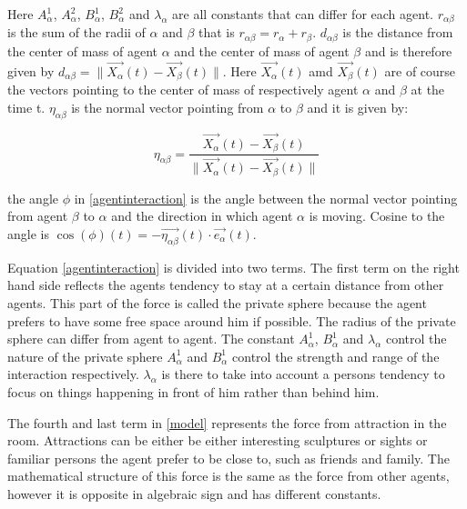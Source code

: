 Here $A_{\alpha}^{1}$, $A_{\alpha}^{2}$, $B_{\alpha}^{1}$, $B_{\alpha}^{2}$ 
and $\lambda_{\alpha}$ are all constants that can differ for each agent. 
$r_{\alpha \beta}$ is the sum of the radii of $\alpha$ and $\beta$ that is 
$r_{\alpha \beta} = r_{\alpha} + r_{\beta}$. $d_{\alpha \beta}$ is the 
distance from the center of mass of agent $\alpha$ and the center of mass of 
agent $\beta$ and is therefore given by $d_{\alpha \beta} = 
\|\vec{X_{\alpha}}\left( t \right) - \vec{X_{\beta}}\left( t \right) \|$. Here 
$\vec{X_{\alpha}}\left( t \right)$ amd $\vec{X_{\beta}}\left( t \right)$ are 
of course the vectors pointing to the center of mass of respectively agent 
$\alpha$ and $\beta$ at the time t. $\eta_{\alpha \beta}$ is the normal vector 
pointing from $\alpha$ to $\beta$ and it is given by:

\begin{equation}
    \eta_{\alpha \beta} =
        \frac{\vec{X_{\alpha}}(t) - \vec{X_{\beta}}(t)}
             {\|\vec{X_{\alpha}}(t) - \vec{X_{\beta}}(t) \|}
\end{equation}

the angle $\phi$ in \eqref{agentinteraction} is the angle between the normal 
vector pointing from agent $\beta$ to $\alpha$ and the direction in which 
agent $\alpha$ is moving. Cosine to the angle is $\cos \left( \phi 
\right)\left( t \right) = - \vec{\eta_{\alpha \beta}}\left( t \right) \cdot 
\vec{e_{\alpha}}\left( t \right)$.

Equation \eqref{agentinteraction} is divided into two terms. The first term on 
the right hand side reflects the agents tendency to stay at a certain distance 
from other agents. This part of the force is called the private sphere because 
the agent prefers to have some free space around him if possible. The radius 
of the private sphere can differ from agent to agent. The constant 
$A_{\alpha}^{1}$, $B_{\alpha}^{1}$ and $\lambda_{\alpha}$ control the nature 
of the private sphere $A_{\alpha}^1$ and $B_{\alpha}^1$ control the strength 
and range of the interaction respectively. $\lambda_{\alpha}$ is there to take 
into account a persons tendency to focus on things happening in front of him 
rather than behind him.

The fourth and last term in \eqref{model} represents the force from attraction 
in the room. Attractions can be either be either interesting sculptures or 
sights or familiar persons the agent prefer to be close to, such as friends 
and family. The mathematical structure of this force is the same as the force 
from other agents, however it is opposite in algebraic sign and has different 
constants. 

